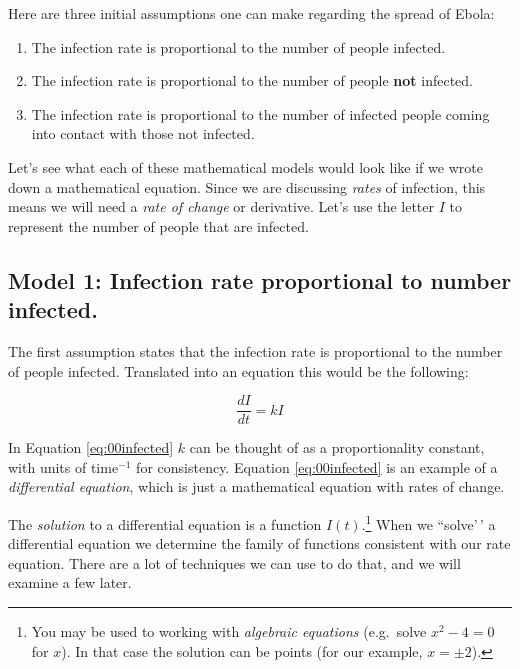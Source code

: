 \documentclass[
]{book}
\providecommand{\tightlist}{%
  \setlength{\itemsep}{0pt}\setlength{\parskip}{0pt}}
\theoremstyle{definition}
\theoremstyle{definition}
\theoremstyle{definition}
\theoremstyle{remark}
\begin{document}
Here are three initial assumptions one can make regarding the spread of Ebola:

\begin{enumerate}
\def\labelenumi{\arabic{enumi}.}
\tightlist
\item
  The infection rate is proportional to the number of people infected.
\item
  The infection rate is proportional to the number of people \textbf{not} infected.
\item
  The infection rate is proportional to the number of infected people coming into contact with those not infected.
\end{enumerate}

Let's see what each of these mathematical models would look like if we wrote down a mathematical equation. Since we are discussing \emph{rates} of infection, this means we will need a \emph{rate of change} or derivative. Let's use the letter \(I\) to represent the number of people that are infected.

\hypertarget{model-1-infection-rate-proportional-to-number-infected.}{%
\subsection{Model 1: Infection rate proportional to number infected.}\label{model-1-infection-rate-proportional-to-number-infected.}}

The first assumption states that the infection rate is proportional to the number of people infected. Translated into an equation this would be the following:

\begin{equation}
\frac{dI}{dt} = kI \label{eq:00infected}
\end{equation}

In Equation \eqref{eq:00infected} \(k\) can be thought of as a proportionality constant, with units of time\(^{-1}\) for consistency. Equation \eqref{eq:00infected} is an example of a \emph{differential equation}, which is just a mathematical equation with rates of change.

The \emph{solution} to a differential equation is a function \(I(t)\).\footnote{You may be used to working with \emph{algebraic equations} (e.g.~solve \(x^{2}-4=0\) for \(x\)). In that case the solution can be points (for our example, \(x=\pm2\)).} When we ``solve'\,' a differential equation we determine the family of functions consistent with our rate equation. There are a lot of techniques we can use to do that, and we will examine a few later.
\end{document}

